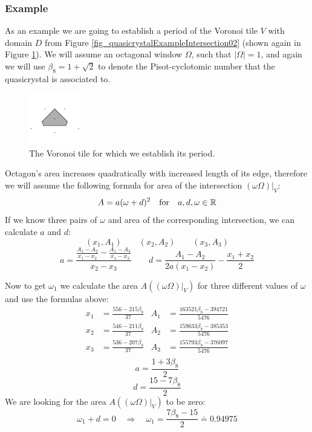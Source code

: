 \documentclass[text.tex]{subfiles}
\begin{document}
\subsubsection{Example}
As an example we are going to establish a period of the Voronoi tile $V$ with domain $D$ from Figure \ref{fig_quasicrystalExampleIntersection02} (shown again in Figure \ref{fig_example2D_tile}). We will assume an octagonal window $\Omega$, such that $|\Omega| = 1$, and again we will use $\beta_8 = 1+\sqrt{2}$ to denote the Pisot-cyclotomic number that the quasicrystal is associated to. 

\begin{figure}[h!]
\centering
\includegraphics[width=0.2\textwidth]{img/2D/intersectionTile03}
\caption{The Voronoi tile for which we establish its period. }
\label{fig_example2D_tile}
\end{figure}

Octagon's area increases quadratically with increased length of its edge, therefore we will assume the following formula for area of the intersection $(\omega\Omega)|_V$: 
$$A = a(\omega+d)^2 \quad\text{for}\quad a,d,\omega\in\mathbb{R}$$
If we know three pairs of $\omega$ and area of the corresponding intersection, we can calculate $a$ and $d$:
$$(x_1,A_1) \qquad (x_2,A_2) \qquad (x_3,A_3)$$
$$a = \frac{\frac{A_1-A_2}{x_1-x_2}-\frac{A_1-A_3}{x_1-x_3}}{x_2-x_3} \qquad d=\frac{A_1-A_2}{2a(x_1-x_2)}-\frac{x_1+x_2}{2}$$

Now to get $\omega_1$ we calculate the area $A((\omega\Omega)|_V)$ for three different values of $\omega$ and use the formulas above: 
\begin{align*}
x_1&=\frac{556-215\beta_8}{37} & A_1&=\frac{163521\beta_8-394721}{5476} \\
x_2&=\frac{546-211\beta_8}{37} & A_2&=\frac{159633\beta_8-385353}{5476} \\
x_3&=\frac{536-207\beta_8}{37} & A_3&=\frac{155793\beta_8-376097}{5476} \\
\end{align*}
$$a = \frac{1+3\beta_8}{2}$$
$$d = \frac{15-7\beta_8}{2}$$
We are looking for the area $A((\omega\Omega)|_V)$ to be zero:
$$\omega_1+d=0\quad\Rightarrow\quad \omega_1 = \frac{7\beta_8-15}{2}\doteq 0.94975$$
\end{document}
